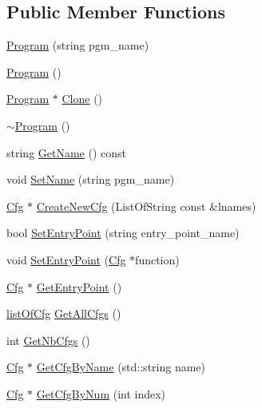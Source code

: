 \subsection*{Public Member Functions}
\begin{DoxyCompactItemize}
\item 
\hyperlink{classcfglib_1_1Program_ad18f1e51efad67f4d553e1de3d5aea55}{Program} (string pgm\+\_\+name)
\item 
\hyperlink{classcfglib_1_1Program_a96682ca2803d6f070767e8449c64eeac}{Program} ()
\item 
\hyperlink{classcfglib_1_1Program}{Program} $\ast$ \hyperlink{classcfglib_1_1Program_a6060c2b04628609085a7e50fdce5dec3}{Clone} ()
\item 
\hyperlink{classcfglib_1_1Program_a91470a76911e981b750085ce19668c34}{$\sim$\+Program} ()
\item 
string \hyperlink{classcfglib_1_1Program_acc4f72ffe5f628e35b0f063d4c3f9e9d}{Get\+Name} () const
\item 
void \hyperlink{classcfglib_1_1Program_acfcd600e324f86042ce08d27ec506cc2}{Set\+Name} (string pgm\+\_\+name)
\item 
\hyperlink{classcfglib_1_1Cfg}{Cfg} $\ast$ \hyperlink{classcfglib_1_1Program_ac8050c9c5e4905f5e27b3071abefba82}{Create\+New\+Cfg} (List\+Of\+String const \&lnames)
\item 
bool \hyperlink{classcfglib_1_1Program_a08aa67ec59bdbd28572dc222fdd2e3da}{Set\+Entry\+Point} (string entry\+\_\+point\+\_\+name)
\item 
void \hyperlink{classcfglib_1_1Program_a9afd774f6cdaed6441b3ecd37887ecd3}{Set\+Entry\+Point} (\hyperlink{classcfglib_1_1Cfg}{Cfg} $\ast$function)
\item 
\hyperlink{classcfglib_1_1Cfg}{Cfg} $\ast$ \hyperlink{classcfglib_1_1Program_a9223048335b62778f7823825a842d0da}{Get\+Entry\+Point} ()
\item 
\hyperlink{namespacecfglib_a6d40ca49d73d6bd01cf38af88645373a}{list\+Of\+Cfg} \hyperlink{classcfglib_1_1Program_a12869527820e336393106010b15ac419}{Get\+All\+Cfgs} ()
\item 
int \hyperlink{classcfglib_1_1Program_abd621c3512b0affedf904d6acbe9941b}{Get\+Nb\+Cfgs} ()
\item 
\hyperlink{classcfglib_1_1Cfg}{Cfg} $\ast$ \hyperlink{classcfglib_1_1Program_a78a1fa44a467ae9e897aea3710f7e931}{Get\+Cfg\+By\+Name} (std\+::string name)
\item 
\hyperlink{classcfglib_1_1Cfg}{Cfg} $\ast$ \hyperlink{classcfglib_1_1Program_a35902ab795a8defb794e0db1ececdf54}{Get\+Cfg\+By\+Num} (int index)

\end{DoxyCompactItemize}
